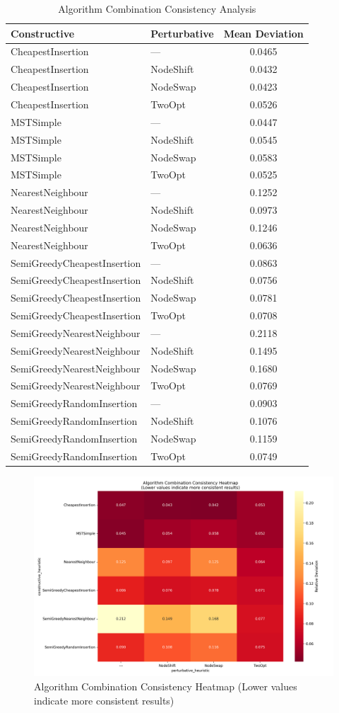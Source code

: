 \documentclass{article}
\begin{document}
\begin{table}[h]
\centering
\begin{tabular}{llc}
\toprule
Constructive & Perturbative & Mean Deviation \\
\midrule
CheapestInsertion & --- & 0.0465 \\
CheapestInsertion & NodeShift & 0.0432 \\
CheapestInsertion & NodeSwap & 0.0423 \\
CheapestInsertion & TwoOpt & 0.0526 \\
MSTSimple & --- & 0.0447 \\
MSTSimple & NodeShift & 0.0545 \\
MSTSimple & NodeSwap & 0.0583 \\
MSTSimple & TwoOpt & 0.0525 \\
NearestNeighbour & --- & 0.1252 \\
NearestNeighbour & NodeShift & 0.0973 \\
NearestNeighbour & NodeSwap & 0.1246 \\
NearestNeighbour & TwoOpt & 0.0636 \\
SemiGreedyCheapestInsertion & --- & 0.0863 \\
SemiGreedyCheapestInsertion & NodeShift & 0.0756 \\
SemiGreedyCheapestInsertion & NodeSwap & 0.0781 \\
SemiGreedyCheapestInsertion & TwoOpt & 0.0708 \\
SemiGreedyNearestNeighbour & --- & 0.2118 \\
SemiGreedyNearestNeighbour & NodeShift & 0.1495 \\
SemiGreedyNearestNeighbour & NodeSwap & 0.1680 \\
SemiGreedyNearestNeighbour & TwoOpt & 0.0769 \\
SemiGreedyRandomInsertion & --- & 0.0903 \\
SemiGreedyRandomInsertion & NodeShift & 0.1076 \\
SemiGreedyRandomInsertion & NodeSwap & 0.1159 \\
SemiGreedyRandomInsertion & TwoOpt & 0.0749 \\

\bottomrule
\end{tabular}
\caption{Algorithm Combination Consistency Analysis}
\end{table}


\begin{figure}[h]
\centering
\includegraphics[width=\textwidth]{figures/algo-variation-analysis.png}
\caption{Algorithm Combination Consistency Heatmap (Lower values indicate more consistent results)}
\end{figure}
\end{document}
